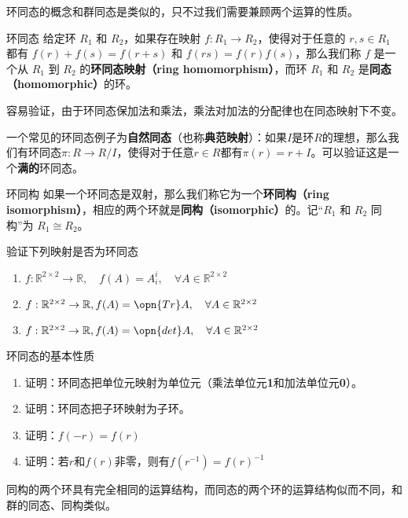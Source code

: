 
\begin{issues}
\issueTODO 
\end{issues}



环同态的概念和群同态是类似的，只不过我们需要兼顾两个运算的性质。


\begin{definition}{环同态}
给定环 $R_1$ 和 $R_2$，如果存在映射 $f:R_1\rightarrow R_2$，使得对于任意的 $r, s\in R_1$ 都有 $f(r)+f(s)=f(r+s)$ 和 $f(rs)=f(r)f(s)$，那么我们称 $f$ 是一个从 $R_1$ 到 $R_2$ 的\textbf{环同态映射（ring homomorphism）}，而环 $R_1$ 和 $R_2$ 是\textbf{同态（homomorphic）}的环。
\end{definition}
容易验证，由于环同态保加法和乘法，乘法对加法的分配律也在同态映射下不变。

一个常见的环同态例子为\textbf{自然同态}（也称\textbf{典范映射}）：如果$I$是环$R$的理想，那么我们有环同态$\pi:R\rightarrow R/I$，使得对于任意$r\in R$都有$\pi (r)=r+I$。可以验证这是一个\textbf{满的}环同态。
\begin{definition}{环同构}
如果一个环同态是双射，那么我们称它为一个\textbf{环同构（ring isomorphism）}，相应的两个环就是\textbf{同构（isomorphic）}的。记“$R_1$ 和 $R_2$ 同构”为 $R_1\cong R_2$。
\end{definition}
\begin{exercise}{验证下列映射是否为环同态}
\begin{enumerate}
\item $f:\mathbb R^{2\times 2}\rightarrow \mathbb R,\quad f(A)=A^i_i,\quad \forall A\in \mathbb R^{2\times 2}$
\item $f:\mathbb R^{2\times 2}\rightarrow \mathbb R,f(A)=\opn {Tr}A,\quad \forall A\in \mathbb R^{2\times 2}$
\item $f:\mathbb R^{2\times 2}\rightarrow \mathbb R,f(A)=\opn {det}A,\quad \forall A\in \mathbb R^{2\times 2}$
\end{enumerate}
\end{exercise}
\begin{exercise}{环同态的基本性质}
\begin{enumerate}
\item 证明：环同态把单位元映射为单位元（乘法单位元\textbf{1}和加法单位元\textbf{0}）。
\item 证明：环同态把子环映射为子环。
\item 证明：$f(-r)=f(r)$
\item 证明：若$r$和$f(r)$非零，则有$f(r^{-1})=f(r)^{-1}$
\end{enumerate}
\end{exercise}
同构的两个环具有完全相同的运算结构，而同态的两个环的运算结构似而不同，和群的同态、同构类似。

